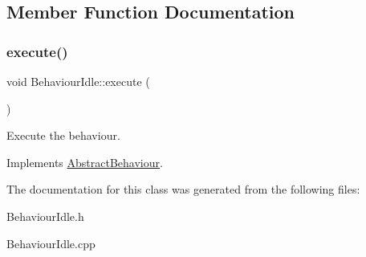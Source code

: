 \subsection{Member Function Documentation}
\mbox{\label{class_behaviour_idle_ac810c315b1ea41772060b216ecdc2e11}} 
\subsubsection{\texorpdfstring{execute()}{execute()}}
{\footnotesize\ttfamily void Behaviour\+Idle\+::execute (\begin{DoxyParamCaption}{ }\end{DoxyParamCaption})\hspace{0.3cm}{\ttfamily [virtual]}}



Execute the behaviour. 



Implements \mbox{\hyperlink{class_abstract_behaviour_ab99fb55a3b001e759e24d5b9721a742f}{Abstract\+Behaviour}}.



The documentation for this class was generated from the following files\+:\begin{DoxyCompactItemize}
\item 
Behaviour\+Idle.\+h\item 
Behaviour\+Idle.\+cpp\end{DoxyCompactItemize}
